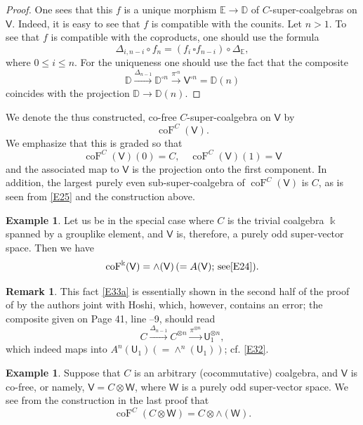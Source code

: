 \documentclass[11pt, a4paper]{amsart}
\theoremstyle{definition}
\newtheorem{rem}[theorem]{Remark}
\newtheorem{example}[theorem]{Example}
\numberwithin{equation}{section}
\begin{document}
\begin{proof}
One sees that this $f$ is a unique morphism $\mathbb{E} \to \mathbb{D}$ of $C$-super-coalgebras on $\mathsf{V}$. 
Indeed, it is easy to see that $f$ is compatible with the counits.
Let $n>1$. 
To see that $f$ is compatible with the coproducts, one should use the formula
\[
\Delta_{i,n-i}\circ f_n=(f_i\, \square f_{n-i})\circ \Delta_{\mathbb{E}}, 
\]
where $0\leq i\leq n$. For the uniqueness one should use the fact that the composite
\[
\mathbb{D}\xrightarrow{\Delta_{n-1}} \mathbb{D}^{\square n}\xrightarrow{\pi^{\square n}} \mathsf{V}^{\square n}
=\mathbb{D}(n)
\]
coincides with the projection $\mathbb{D}\to \mathbb{D}(n)$. 
\end{proof}

We denote the thus constructed, co-free $C$-super-coalgebra on $\mathsf{V}$ by
\[ \operatorname{coF}^{C}(\mathsf{V}). \]
We emphasize that this is graded so that 
\begin{equation}\label{E33}
\operatorname{coF}^{C}(\mathsf{V})(0)=C,\quad \operatorname{coF}^{C}(\mathsf{V})(1)=\mathsf{V} 
\end{equation}
and the associated map to $\mathsf{V}$ is the projection onto the first component.
In addition, the largest purely even sub-super-coalgebra of $\operatorname{coF}^{C}(\mathsf{V})$
is $C$, as is seen from \eqref{E25} and the construction above. 

\begin{example}\label{Ex31}
Let us be in the special case where $C$ is the trivial coalgebra $\Bbbk$ spanned by a grouplike element, and $\mathsf{V}$ is, therefore, a purely odd super-vector space.
Then we have
\begin{equation}\label{E33a}
\operatorname{coF}^{\Bbbk}(\mathsf{V}) = \wedge(\mathsf{V})\, (=A(\mathsf{V}) \text{; see} \eqref{E24}). 
\end{equation}
\end{example}
\begin{rem}\label{R31}
This fact \eqref{E33a} is essentially shown in the second half of the proof of \cite[Propsition 3.11]{HMT} by the authors joint with Hoshi, which, however, contains an error; the composite given on Page 41, line --9, should read
\[ C \xrightarrow{\Delta_{n-1}} C^{\otimes n} \xrightarrow{\pi^{\otimes n}} \mathsf{U}_{1}^{\otimes n}, \]
which indeed maps into $A^{n}(\mathsf{U}_{1}) (= \wedge^{n}(\mathsf{U}_{1}))$; cf. \eqref{E32}.
\end{rem}
\begin{example}\label{Ex32}
Suppose that $C$ is an arbitrary (cocommutative) coalgebra, and $\mathsf{V}$ is co-free, or namely, $\mathsf{V} = C \otimes \mathsf{W}$, where $\mathsf{W}$ is a purely odd super-vector space.
We see from the construction in the last proof that
\begin{equation}\label{E33b}
\operatorname{coF}^{C}(C \otimes \mathsf{W}) = C \otimes \wedge(\mathsf{W}). 
\end{equation}
\end{example}
\end{document}
